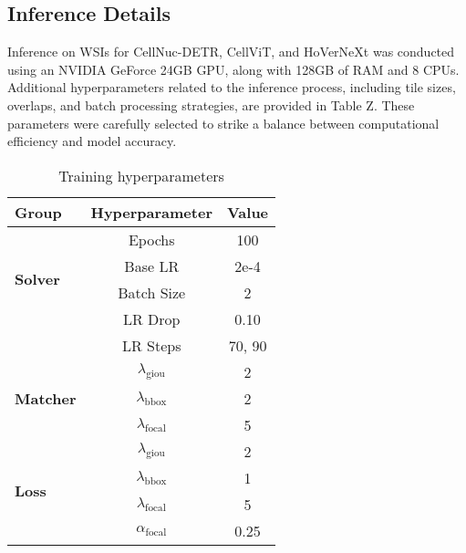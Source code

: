 \subsection{Inference Details}

Inference on WSIs for CellNuc-DETR, CellViT, and HoVerNeXt was conducted using an NVIDIA GeForce 24GB GPU, along with 128GB of RAM and 8 CPUs. Additional hyperparameters related to the inference process, including tile sizes, overlaps, and batch processing strategies, are provided in Table Z. These parameters were carefully selected to strike a balance between computational efficiency and model accuracy.

\begin{table}[h]
\centering
\caption{Training hyperparameters}
\label{tab:hyperparams}
\begin{tabular}{l|cc}
\toprule
\textbf{Group} & \textbf{Hyperparameter} & \textbf{Value} \\
\midrule
\multirow{4}{*}{\textbf{Solver}} & Epochs & 100 \\
 & Base LR & 2e-4 \\
 & Batch Size & 2 \\
 & LR Drop & 0.10 \\
 & LR Steps & 70, 90 \\
\midrule
\multirow{3}{*}{\textbf{Matcher}} & $\lambda_{\text{giou}}$ & 2 \\
 & $\lambda_{\text{bbox}}$ & 2 \\
 & $\lambda_{\text{focal}}$ & 5 \\
\midrule
\multirow{4}{*}{\textbf{Loss}} & $\lambda_{\text{giou}}$ & 2 \\
 & $\lambda_{\text{bbox}}$ & 1 \\
 & $\lambda_{\text{focal}}$ & 5 \\
 & $\alpha_{\text{focal}}$ & 0.25 \\
\bottomrule

\end{tabular}
\end{table}


